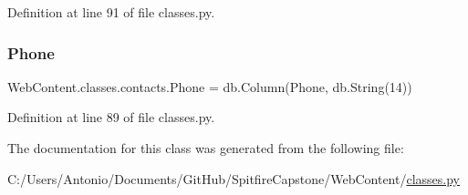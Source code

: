 Definition at line 91 of file classes.\+py.

\mbox{\label{class_web_content_1_1classes_1_1contacts_aa4c26f3a90e573a3d5495dd9fea09067}} 
\subsubsection{\texorpdfstring{Phone}{Phone}}
{\footnotesize\ttfamily Web\+Content.\+classes.\+contacts.\+Phone = db.\+Column(\textquotesingle{}Phone\textquotesingle{}, db.\+String(14))\hspace{0.3cm}{\ttfamily [static]}}



Definition at line 89 of file classes.\+py.



The documentation for this class was generated from the following file\+:\begin{DoxyCompactItemize}
\item 
C\+:/\+Users/\+Antonio/\+Documents/\+Git\+Hub/\+Spitfire\+Capstone/\+Web\+Content/\hyperlink{classes_8py}{classes.\+py}\end{DoxyCompactItemize}
